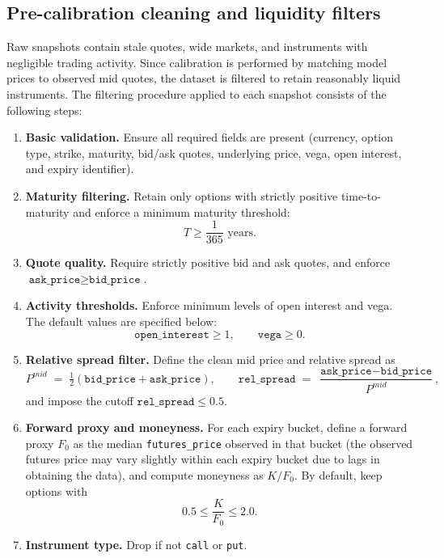 \documentclass[a4paper,titlepage,12pt]{report}
\theoremstyle{plain}
\begin{document}
\subsection{Pre-calibration cleaning and liquidity filters}\label{subsec:data_filters}

Raw snapshots contain stale quotes, wide markets, and instruments with negligible trading activity. Since calibration is performed by matching model prices to observed mid quotes, the dataset is filtered to retain reasonably liquid instruments. The filtering procedure applied to each snapshot consists of the following steps:

\begin{enumerate}[leftmargin=1.8em]
    \item \textbf{Basic validation.} Ensure all required fields are present (currency, option type, strike, maturity, bid/ask quotes, underlying price, vega, open interest, and expiry identifier).
    \item \textbf{Maturity filtering.} Retain only options with strictly positive time-to-maturity and enforce a minimum maturity threshold:
    \[
    T \ge \frac{1}{365} \text{ years}.
    \]
    \item \textbf{Quote quality.} Require strictly positive bid and ask quotes, and enforce $\texttt{ask\_price} \ge \texttt{bid\_price}$.
    \item \textbf{Activity thresholds.} Enforce minimum levels of open interest and vega. The default values are specified below:
    \[
    \texttt{open\_interest} \ge 1, \qquad \texttt{vega} \ge 0.
    \]
    \item \textbf{Relative spread filter.} Define the clean mid price and relative spread as
    \[
    P^{mid} \;=\; \tfrac12(\texttt{bid\_price}+\texttt{ask\_price}), \qquad
    \texttt{rel\_spread} \;=\; \frac{\texttt{ask\_price}-\texttt{bid\_price}}{P^{mid}},
    \]
    and impose the cutoff $\texttt{rel\_spread} \le 0.5$.
    \item \textbf{Forward proxy and moneyness.} For each expiry bucket, define a forward proxy $F_0$ as the median \texttt{futures\_price} observed in that bucket (the observed futures price may vary slightly within each expiry bucket due to lags in obtaining the data), and compute moneyness as $K/F_0$. By default, keep options with
    \[
    0.5 \le \frac{K}{F_0} \le 2.0.
    \]
    \item \textbf{Instrument type.} Drop if not \texttt{call} or \texttt{put}.
\end{enumerate}
\end{document}
